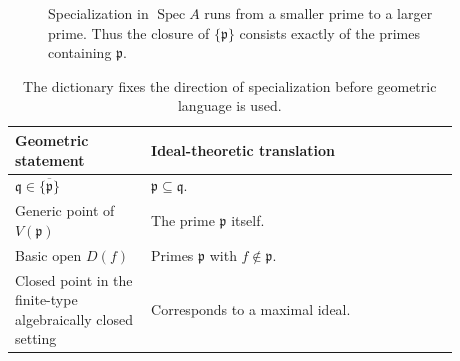 \begin{figure}[htbp]
\centering
{}
\caption{Specialization in $\operatorname{Spec}A$ runs from a smaller prime to a larger
prime. Thus the closure of $\{\mathfrak p\}$ consists exactly of the primes containing
$\mathfrak p$.}
\label{fig:vi07-c07-specialization}
\end{figure}

\begin{table}[htbp]
\centering\small
\begin{tabular}{p{0.27\linewidth}p{0.61\linewidth}}
\toprule
Geometric statement & Ideal-theoretic translation\\
\midrule
$\mathfrak q\in\overline{\{\mathfrak p\}}$ & $\mathfrak p\subseteq\mathfrak q$.\\
Generic point of $V(\mathfrak p)$ & The prime $\mathfrak p$ itself.\\
Basic open $D(f)$ & Primes $\mathfrak p$ with $f\notin\mathfrak p$.\\
Closed point in the finite-type algebraically closed setting & Corresponds to a maximal ideal.\\
\bottomrule
\end{tabular}
\caption{The dictionary fixes the direction of specialization before geometric language is used.}
\label{tab:vi07-c07-spec-dictionary}
\end{table}
